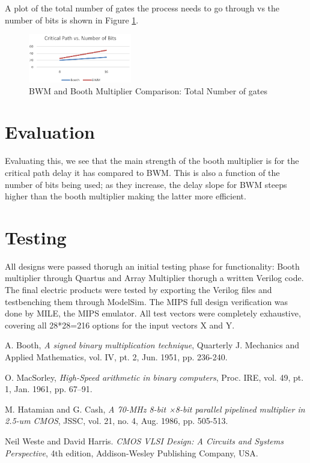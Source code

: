 \documentclass[journal]{IEEEtran}
\begin{document}
A plot of the total number of gates the process needs to go through vs the number of bits is shown in Figure \ref{fig:14}.

\begin{figure}[h!]
  \centering
  \includegraphics[width=0.4\textwidth]{14.png}
  \centering
  \caption{BWM and Booth Multiplier Comparison: Total Number of gates}
  \label{fig:14}
\end{figure}

\vspace{-5pt}

\section{Evaluation}

Evaluating this, we see that the main strength of the booth multiplier is for the critical path delay it has compared to BWM. This is also a function of the number of bits being used; as they increase, the delay slope for BWM steeps higher than the booth multiplier making the latter more efficient.



\section{Testing}


All designs were passed thorugh an initial testing phase for functionality: Booth multiplier through Quartus and Array Multiplier thorugh a written Verilog code. The final electric products were tested by exporting the Verilog files and testbenching them through ModelSim. The MIPS full design verification was done by MILE, the MIPS emulator. All test vectors were completely exhaustive, covering all 28*28=216 options for the input vectors X and Y.



\begin{thebibliography}{1}


A. Booth, \emph{A signed binary multiplication technique}, Quarterly J. 
Mechanics and Applied Mathematics, vol. IV, pt. 2, Jun. 1951, pp. 236-240.

O. MacSorley, \emph{High-Speed arithmetic in binary computers}, Proc. IRE, 
vol. 49, pt. 1, Jan. 1961, pp. 67–91.

M. Hatamian and G. Cash, \emph{A 70-MHz 8-bit ×8-bit parallel pipelined 
multiplier in 2.5-um CMOS}, 
JSSC, vol. 21, no. 4, Aug. 1986, pp. 505-513.

Neil Weste and David Harris. \emph{CMOS VLSI Design: A Circuits and 
Systems Perspective}, 4th edition, Addison-Wesley Publishing Company, 
USA.



\end{thebibliography}




\end{document}
